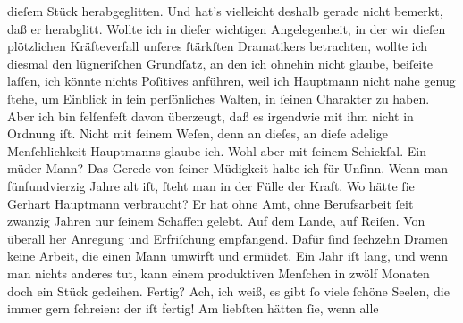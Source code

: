 \begin{ledgroupsized}[t]{13cm}
{{                  dieſem Stück
                  herabgeglitten. Und hat’s vielleicht deshalb gerade nicht bemerkt, daß er
                  herabglitt. Wollte ich in dieſer wichtigen Angelegenheit, in der wir dieſen
                  plötzlichen Kräfteverfall unſeres ſtärkſten Dramatikers betrachten, wollte ich
                  diesmal den lügneriſchen Grundſatz, an den ich ohnehin nicht glaube, beiſeite
                  laſſen, ich könnte nichts Poſitives anführen, weil ich Hauptmann nicht nahe genug ſtehe, um Einblick in ſein
                  perſönliches Walten, in ſeinen Charakter zu haben. Aber ich bin felſenfeſt davon
                  überzeugt, daß es irgendwie mit ihm nicht in Ordnung iſt. Nicht mit ſeinem Weſen,
                  denn an dieſes, an dieſe adelige Menſchlichkeit Hauptmanns glaube ich. Wohl aber mit ſeinem Schickſal. Ein müder Mann?
                  Das Gerede von ſeiner Müdigkeit halte ich für Unſinn. Wenn man fünfundvierzig
                  Jahre alt iſt, ſteht man in der Fülle der Kraft. Wo hätte ſie Gerhart Hauptmann verbraucht? Er hat ohne Amt, ohne
                  Berufsarbeit ſeit zwanzig Jahren nur ſeinem Schaffen gelebt. Auf dem Lande, auf
                  Reiſen. Von überall her Anregung und Erfriſchung empfangend. Dafür ſind ſechzehn
                  Dramen keine Arbeit, die einen Mann umwirft und ermüdet. Ein Jahr iſt lang, und
                  wenn man nichts anderes tut, kann einem produktiven Menſchen in zwölf Monaten doch
                  ein Stück gedeihen. Fertig? Ach, ich weiß, es gibt ſo viele ſchöne Seelen, die
                  immer gern ſchreien: der iſt fertig! Am liebſten hätten ſie, wenn alle
}}
\end{ledgroupsized}
